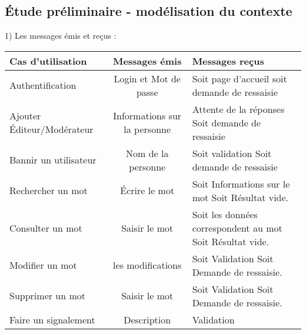 \documentclass{article}
\begin{document}
\subsection{Étude préliminaire - modélisation du contexte}

1) Les messages émis et reçus : \\

\begin{tabularx}{\textwidth}{|l|c|X|}
  \hline
  \textbf{Cas d'utilisation} & 
  \textbf{Messages émis} & 
  \textbf{Messages reçus} \\
  \hline
  Authentification & 
  Login et Mot de passe & Soit page d'accueil soit demande de ressaisie
  \\ 
   \hline
  \hline
 Ajouter Éditeur/Modérateur & Informations sur la personne & Attente de la réponses Soit demande de ressaisie
    \\
  \hline
  \hline
 Bannir un utilisateur & Nom de la personne  &  Soit validation Soit demande de ressaisie
    \\
  \hline
    \hline
 Rechercher un mot & Écrire le mot &  Soit Informations sur le mot Soit Résultat vide.
    \\
  \hline
   \hline
 Consulter un mot & Saisir le mot &  Soit les données correspondent au mot Soit Résultat vide.
    \\
  \hline
   \hline
 Modifier un mot & les modifications &  Soit Validation  Soit Demande de ressaisie.
    \\
  \hline
    \hline
 Supprimer un mot & Saisir le mot &  Soit Validation  Soit Demande de ressaisie.
    \\
  \hline
      \hline
 Faire un signalement & Description &  Validation
    \\
  \hline
\end{tabularx}
\end{document}
